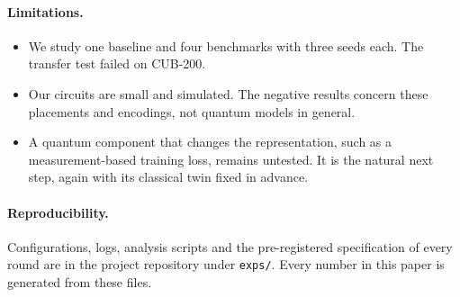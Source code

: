 \paragraph{Limitations.}
\begin{itemize}
  \item We study one baseline and four benchmarks with three seeds each.
    The transfer test failed on CUB-200.
  \item Our circuits are small and simulated. The negative results concern
    these placements and encodings, not quantum models in general.
  \item A quantum component that changes the representation, such as a
    measurement-based training loss, remains untested. It is the natural
    next step, again with its classical twin fixed in advance.
\end{itemize}

\paragraph{Reproducibility.}
Configurations, logs, analysis scripts and the pre-registered
specification of every round are in the project repository under
\texttt{exps/}. Every number in this paper is generated from these files.
